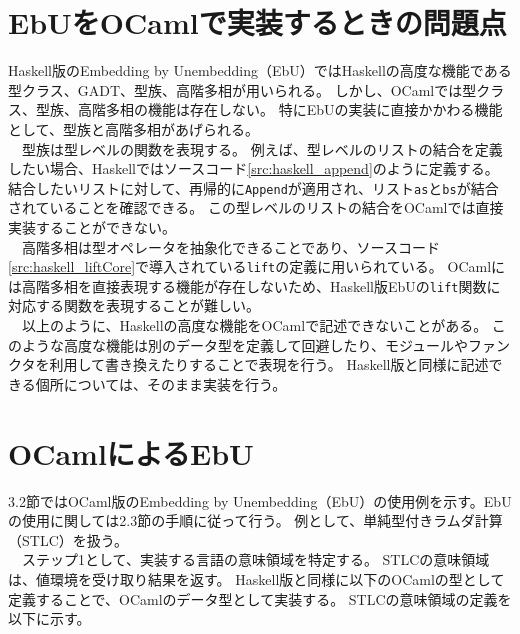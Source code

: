 \documentclass[uplatex]{sumiilab-paper}
\theoremstyle{mystyle}
\numberwithin{definition}{chapter} %
\begin{document}
\section{EbUをOCamlで実装するときの問題点}
Haskell版のEmbedding by Unembedding（EbU）ではHaskellの高度な機能である型クラス、GADT、型族、高階多相が用いられる。
しかし、OCamlでは型クラス、型族、高階多相の機能は存在しない。
特にEbUの実装に直接かかわる機能として、型族と高階多相があげられる。\\
　型族は型レベルの関数を表現する。
例えば、型レベルのリストの結合を定義したい場合、Haskellではソースコード\ref{src:haskell_append}のように定義する。
結合したいリストに対して、再帰的に{\tt Append}が適用され、リスト{\tt as}と{\tt bs}が結合されていることを確認できる。
この型レベルのリストの結合をOCamlでは直接実装することができない。\\
　高階多相は型オペレータを抽象化できることであり、ソースコード\ref{src:haskell_liftCore}で導入されている{\tt lift}の定義に用いられている。
OCamlには高階多相を直接表現する機能が存在しないため、Haskell版EbUの{\tt lift}関数に対応する関数を表現することが難しい。\\
　以上のように、Haskellの高度な機能をOCamlで記述できないことがある。
このような高度な機能は別のデータ型を定義して回避したり、モジュールやファンクタを利用して書き換えたりすることで表現を行う。
Haskell版と同様に記述できる個所については、そのまま実装を行う。

\section{OCamlによるEbU}
3.2節ではOCaml版のEmbedding by Unembedding（EbU）の使用例を示す。EbUの使用に関しては2.3節の手順に従って行う。
例として、単純型付きラムダ計算（STLC）を扱う。\\
　ステップ1として、実装する言語の意味領域を特定する。
STLCの意味領域は、値環境を受け取り結果を返す。
Haskell版と同様に以下のOCamlの型として定義することで、OCamlのデータ型として実装する。
STLCの意味領域の定義を以下に示す。
\end{document}
